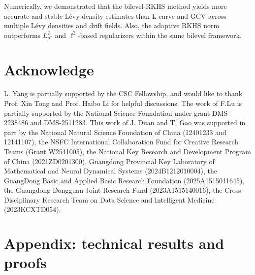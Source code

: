 \documentclass[12pt]{article}
\numberwithin{equation}{section}
\numberwithin{theorem}{section}
\begin{document}
Numerically, we demonstrated that the bilevel-RKHS method yields more accurate and stable L\'evy density estimates than L-curve and GCV across multiple L\'evy densities and drift fields. Also, the adaptive RKHS norm outperforms $L^2_\rho$- and $\ell^2$-based regularizers within the same bilevel framework.







\section*{Acknowledge}
L. Yang is partially supported by the CSC Fellowship, and would like to thank Prof. Xin Tong and Prof. Haibo Li for helpful discussions. The work of F.Lu is partially supported by the National Science Foundation under grant DMS-2238486 and DMS-2511283. This work of J. Duan and T. Gao was supported in part by the National Natural Science Foundation of China (12401233 and 12141107), the NSFC  International Collaboration Fund  for Creative Research Teams (Grant W2541005), the National Key Research and Development Program of China (2021ZD0201300), Guangdong Provincial Key Laboratory of Mathematical and Neural Dynamical Systems (2024B1212010004), the GuangDong Basic and Applied Basic Research Foundation (2025A1515011645), the Guangdong-Dongguan Joint Research Fund (2023A1515140016), the Cross Disciplinary Research Team on Data Science and Intelligent Medicine (2023KCXTD054).



\appendix
\section{Appendix: technical results and proofs}
\label{append:A}
\end{document}

